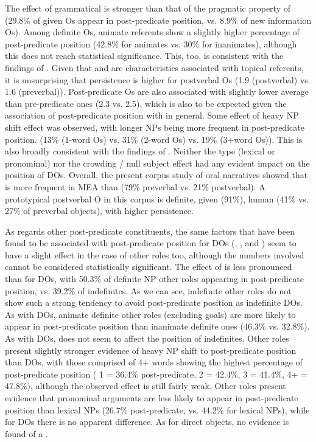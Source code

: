 \documentclass[output=paper,colorlinks,citecolor=brown,draftmode]{langscibook}
\begin{document}
\begin{sloppypar}
The effect of grammatical  is stronger than that of the pragmatic property of  (29.8\% of given Os appear in post-predicate position, vs. 8.9\% of new information Os). Among definite Os, animate referents show a slightly higher percentage of post-predicate position (42.8\% for animates vs. 30\% for inanimates), although this does not reach statistical significance. This, too, is consistent with the findings of \citet{samvelian_persistence_2023}. Given that  and  are characteristics associated with topical referents, it is unsurprising that  persistence is higher for postverbal Os (1.9 (postverbal) vs. 1.6 (preverbal)). Post-predicate Os are also associated with slightly lower average  than pre-predicate ones (2.3 vs. 2.5), which is also to be expected given the association of post-predicate position with  in general. Some effect of heavy NP shift effect was observed, with longer NPs being more frequent in post-predicate position. (13\% (1-word Os) vs. 31\% (2-word Os) vs. 19\% (3+word Os)). This is also broadly consistent with the findings of \citet{samvelian_persistence_2023}. Neither the  type (lexical or pronominal) nor the crowding / null subject effect had any evident impact on the position of DOs. Overall, the present corpus study of oral narratives showed that   is more frequent in MEA than  (79\% preverbal vs. 21\% postverbal). A prototypical postverbal O in this corpus is definite, given (91\%), human (41\% vs. 27\% of preverbal objects), with higher  persistence.
\end{sloppypar}

As regards other post-predicate constituents, the same factors that have been found to be associated with post-predicate position for DOs  (, , and ) seem to have a slight effect in the case of other roles too, although the numbers involved cannot be considered statistically significant. The effect of  is less pronounced than for DOs, with 50.3\% of definite NP other roles appearing in post-predicate position, vs. 39.2\% of indefinites. As we can see, indefinite other roles do not show such a strong tendency to avoid post-predicate position as indefinite DOs. As with DOs, animate definite other roles (excluding goals) are more likely to appear in post-predicate position than inanimate definite ones (46.3\% vs. 32.8\%). As with DOs,  does not seem to affect the position of indefinites. Other roles present slightly stronger evidence of heavy NP shift to post-predicate position than DOs, with those comprised of 4+ words showing the highest percentage of post-predicate position ( 1 = 36.4\% post-predicate,  2 = 42.4\%,  3 = 41.4\%,  4+ = 47.8\%), although the observed effect is still fairly weak. Other roles present evidence that pronominal arguments are less likely to appear in post-predicate position than lexical NPs (26.7\% post-predicate, vs. 44.2\% for lexical NPs), while for DOs there is no apparent difference. As for direct objects, no evidence is found of a .
\end{document}
